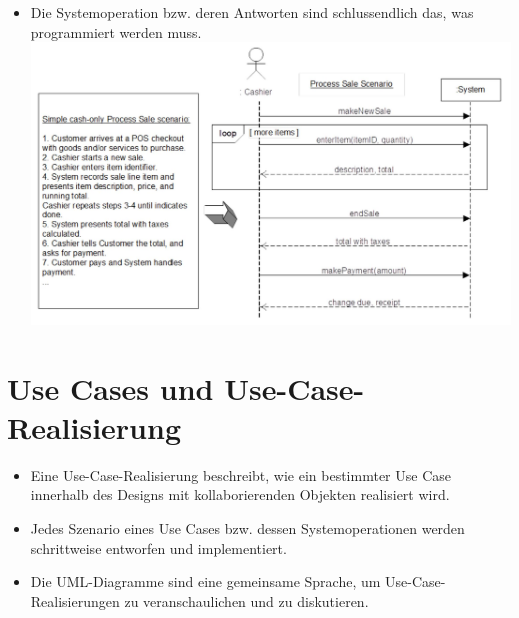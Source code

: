 \documentclass[10pt]{article}
\begin{document}
\begin{itemize}
  \item Die Systemoperation bzw. deren Antworten sind schlussendlich das, was programmiert werden muss.\\
\includegraphics[max width=\textwidth, center]{2025_01_02_787afb9584031d2940deg-07}
\end{itemize}

\section*{Use Cases und Use-Case-Realisierung}
\begin{itemize}
  \item Eine Use-Case-Realisierung beschreibt, wie ein bestimmter Use Case innerhalb des Designs mit kollaborierenden Objekten realisiert wird.
  \item Jedes Szenario eines Use Cases bzw. dessen Systemoperationen werden schrittweise entworfen und implementiert.
  \item Die UML-Diagramme sind eine gemeinsame Sprache, um Use-Case-Realisierungen zu veranschaulichen und zu diskutieren.
\end{itemize}
\end{document}
